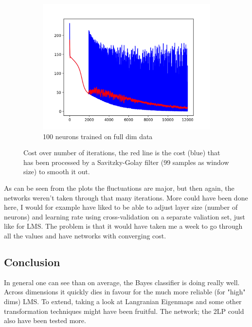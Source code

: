 \documentclass[12pt, a4paper]{article}
\begin{document}
\begin{figure}[H]
\begin{subfigure}{0.3\textwidth}
        \includegraphics[width=\textwidth]{recursos/1/cost_100}
        \caption{100 neurons trained on full dim data}
    \end{subfigure}
     \caption{Cost over number of iterations, the red line is the cost (blue) that has been processed by a Savitzky-Golay filter (99 samples as window size) to smooth it out.}
\end{figure}

As can be seen from the plots the fluctuations are major, but then again, the networks weren't taken through that many iterations. More could have been done here, I would for example have liked to be able to adjust layer size (number of neurons) and learning rate using cross-validation on a separate valiation set, just like for LMS. The problem is that it would have taken me a week to go through all the values and have networks with converging cost.



\subsection{Conclusion }
In general one can see than on average, the Bayes classifier is doing really well. Across dimensions it quickly dies in favour for the much more reliable (for "high" dims) LMS. To extend, taking a look at Langranian Eigenmaps and some other transformation techniques might have been fruitful. The network; the 2LP could also have been tested more.
\end{document}
